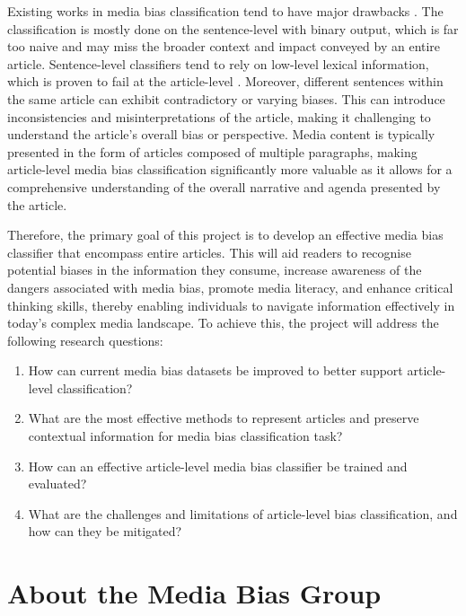 Existing works in media bias classification tend to have major drawbacks \cite{maab-2023-lexical-bias-detection, maab-2023-target-aware, guo-2022-modeling, van-den-berg-2020-context,lee-2021-unifying,lei-2022-sentence,lei-2024-event-relation}.
The classification is mostly done on the sentence-level with binary output, which is far too naive and may miss the broader context and impact conveyed by an entire article. Sentence-level classifiers tend to rely on low-level lexical information, which is proven to fail at the article-level \cite{chen-2020-detecting-media-bias-gaussian}. Moreover, different sentences within the same article can exhibit contradictory or varying biases. This can introduce inconsistencies and misinterpretations of the article, making it challenging to understand the article's overall bias or perspective. Media content is typically presented in the form of articles composed of multiple paragraphs, making article-level media bias classification significantly more valuable as it allows for a comprehensive understanding of the overall narrative and agenda presented by the article.

Therefore, the primary goal of this project is to develop an effective media bias classifier that encompass entire articles. This will aid readers to recognise potential biases in the information they consume, increase awareness of the dangers associated with media bias, promote media literacy, and enhance critical thinking skills, thereby enabling individuals to navigate information effectively in today's complex media landscape. To achieve this, the project will address the following research questions:
\begin{enumerate}
    \item How can current media bias datasets be improved to better support article-level classification?
    \item What are the most effective methods to represent articles and preserve contextual information for media bias classification task?
    \item How can an effective article-level media bias classifier be trained and evaluated?
    \item What are the challenges and limitations of article-level bias classification, and how can they be mitigated?
\end{enumerate}

\section{About the Media Bias Group}

